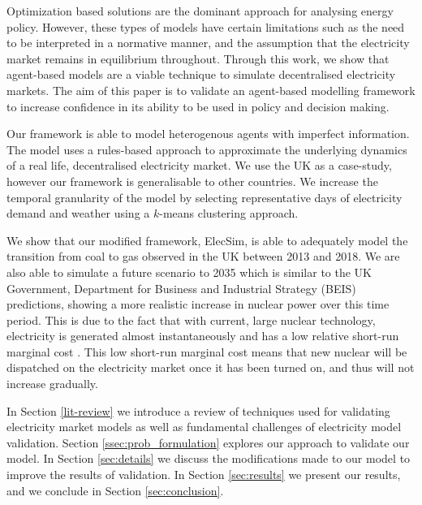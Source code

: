 	Optimization based solutions are the dominant approach for analysing energy policy. However, these types of models have certain limitations such as the need to be interpreted in a normative manner, and the assumption that the electricity market remains in equilibrium throughout. Through this work, we show that agent-based models are a viable technique to simulate decentralised electricity markets. The aim of this paper is to validate an agent-based modelling framework to increase confidence in its ability to be used in policy and decision making. 
	
	
	
	Our framework is able to model heterogenous agents with imperfect information. The model uses a rules-based approach to approximate the underlying dynamics of a real life, decentralised electricity market. We use the UK as a case-study, however our framework is generalisable to other countries. We increase the temporal granularity of the model by selecting representative days of electricity demand and weather using a $k$-means clustering approach. 
	
	
	
	
	We show that our modified framework, ElecSim, is able to adequately model the transition from coal to gas observed in the UK between 2013 and 2018. We are also able to simulate a future scenario to 2035 which is similar to the UK Government, Department for Business and Industrial Strategy (BEIS) predictions, showing a more realistic increase in nuclear power over this time period. This is due to the fact that with current, large nuclear technology, electricity is generated almost instantaneously and has a low relative short-run marginal cost \cite{Department2016}. This low short-run marginal cost means that new nuclear will be dispatched on the electricity market once it has been turned on, and thus will not increase gradually.
	
	
	
	



In Section \ref{lit-review} we introduce a review of techniques used for validating electricity market models as well as fundamental challenges of electricity model validation. Section \ref{ssec:prob_formulation} explores our approach to validate our model. In Section \ref{sec:details} we discuss the modifications made to our model to improve the results of validation. In Section \ref{sec:results} we present our results, and we conclude in Section \ref{sec:conclusion}.


